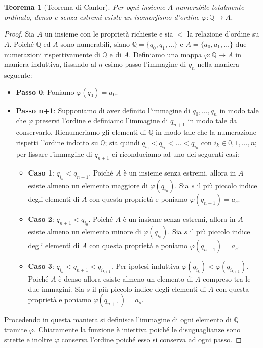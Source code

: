 \documentclass[12pt,a4paper,openright]{report}
\newcommand{\Q}{\mathbb{Q}} %
\newcommand{\0}{\setminus\{0\}} %
\theoremstyle{definition}
\theoremstyle{plain}
\newtheorem{theo}[defn]{Teorema}
\begin{document}
\begin{theo}[Teorema di Cantor]\label{theo:cantor}
    Per ogni insieme $A$ numerabile totalmente ordinato, denso e senza estremi esiste un isomorfismo d'ordine $\varphi: \Q \rightarrow A$.
\end{theo}
\begin{proof}
    Sia $A$ un insieme con le proprietà richieste e sia $<$ la relazione d'ordine su $A$.
    Poiché $\Q$ ed $A$ sono numerabili, siano $\Q=\{q_0,q_1,\ldots\}$ e $A=\{a_0,a_1,\ldots \}$ due numerazioni rispettivamente di $\Q$ e di $A$. Definiamo una mappa $\varphi: \Q \rightarrow A$ in maniera induttiva, fissando al $n$-esimo passo l'immagine di $q_n$ nella maniera seguente:
    \begin{itemize}
        \item[] \textbf{Passo 0}: Poniamo $\varphi(q_0)=a_0$.
        \item[] \textbf{Passo n+1}: Supponiamo di aver definito l'immagine di $q_0,\ldots,q_n$ in modo tale che $\varphi$ preservi l'ordine e definiamo l'immagine di $q_{n+1}$ in modo tale da conservarlo. Rienumeriamo gli elementi di $\Q$ in modo tale che la numerazione rispetti l'ordine indotto su $\Q$; sia quindi $q_{i_0}<q_{i_1}<\ldots<q_{i_n}$ con $i_k \in {0,1,\ldots,n}$; per fissare l'immagine di $q_{n+1}$ ci riconduciamo ad uno dei seguenti casi:
        \begin{itemize}
            \item[] \textbf{Caso 1}: $q_{i_n}<q_{n+1}$. Poiché $A$ è un insieme senza estremi, allora in $A$ esiste almeno un elemento maggiore di $\varphi(q_{i_n})$. Sia $s$ il più piccolo indice degli elementi di $A$ con questa proprietà e poniamo $\varphi(q_{n+1})=a_s$.
            \item[] \textbf{Caso 2}: $q_{n+1}<q_{i_0}$. Poiché $A$ è un insieme senza estremi, allora in $A$ esiste almeno un elemento minore di $\varphi(q_{i_0})$. Sia $s$ il più piccolo indice degli elementi di $A$ con questa proprietà e poniamo $\varphi(q_{n+1})=a_s$.
            \item[] \textbf{Caso 3}: $q_{i_k}<q_{n+1}<q_{i_{k+1}}$. Per ipotesi induttiva $\varphi(q_{i_k})<\varphi(q_{i_{k+1}})$. Poiché $A$ è denso allora esiste almeno un elemento di $A$ compreso tra le due immagini. Sia $s$ il più piccolo indice degli elementi di $A$ con questa proprietà e poniamo $\varphi(q_{n+1})=a_s$.
        \end{itemize} 
    \end{itemize}
    Procedendo in questa maniera si definisce l'immagine di ogni elemento di $\Q$ tramite $\varphi$. Chiaramente la funzione è iniettiva poiché le disuguaglianze sono strette e inoltre $\varphi$ conserva l'ordine poiché esso si conserva ad ogni passo. 


\end{proof}
\end{document}

